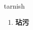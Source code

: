 
\begin{frame}
{\huge tarnish}
\begin{center}
\begin{enumerate}\Large
  \item \textbf{玷污}
\end{enumerate}
\end{center}
\end{frame}

